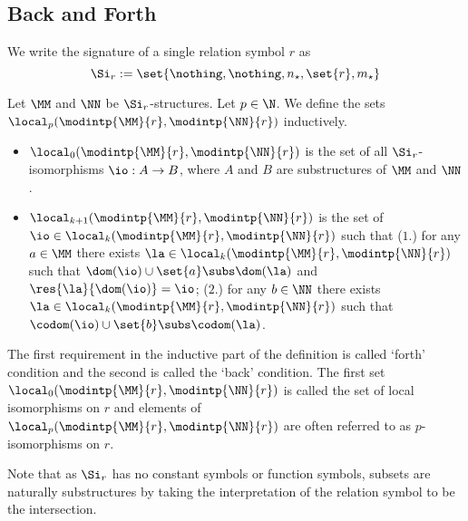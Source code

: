 \subsection{Back and Forth}
\begin{nttn}
    We write the signature of a single relation symbol $r$ as
    \[\Si_r := \set{\nothing,\nothing,n_\star,\set{r},m_\star}\]
\end{nttn}

\begin{dfn}
    Let $\MM$ and $\NN$ be $\Si_r$-structures.
    Let $p \in \N$.
    We define the sets $\local_p(\modintp{\MM}{r},\modintp{\NN}{r})$
    inductively.
    \begin{itemize}
        \item $\local_0(\modintp{\MM}{r},\modintp{\NN}{r})$ is the set of 
            all $\Si_r$-isomorphisms $\io : A \to B$, where 
            $A$ and $B$ are substructures of $\MM$ and $\NN$.
        \item $\local_{k+1}(\modintp{\MM}{r},\modintp{\NN}{r})$ is the 
            set of $\io \in \local_{k}(\modintp{\MM}{r},\modintp{\NN}{r})$ 
            such that ($1.$) for any $a \in \MM$ there exists 
            $\la \in \local_{k}(\modintp{\MM}{r},\modintp{\NN}{r})$
            such that $\dom(\io) \cup \set{a} \subs \dom(\la)$
            and $\res{\la}{\dom(\io)} = \io$;
            ($2.$) for any $b \in \NN$ there exists 
            $\la \in \local_{k}(\modintp{\MM}{r},\modintp{\NN}{r})$
            such that $\codom(\io) \cup \set{b} \subs \codom(\la)$.
    \end{itemize}
    The first requirement in the inductive part of the definition is called 
    `forth' condition and the second is called the `back' condition.
    The first set $\local_0(\modintp{\MM}{r},\modintp{\NN}{r})$ is called 
    the set of local isomorphisms on $r$ and elements of 
    $\local_p(\modintp{\MM}{r},\modintp{\NN}{r})$ are often referred to 
    as $p$-isomorphisms on $r$.

    Note that as $\Si_r$ has no constant symbols or function symbols,
    subsets are naturally substructures by taking the interpretation of 
    the relation symbol to be the intersection.
\end{dfn}


